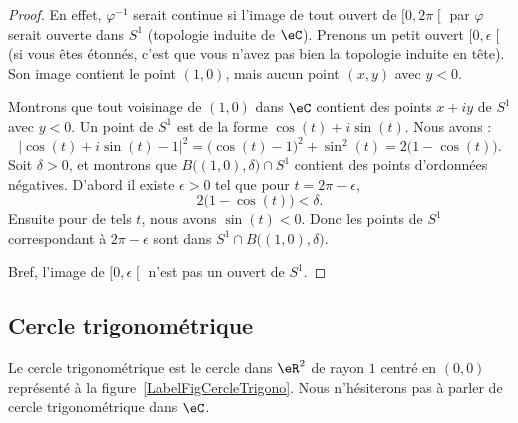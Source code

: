 \begin{proof}
	En effet, \( \varphi^{-1}\) serait continue si l'image de tout ouvert de \( \mathopen[ 0 , 2\pi \mathclose[\) par \( \varphi\) serait ouverte dans \( S^1\) (topologie induite de \( \eC\)). Prenons un petit ouvert \( \mathopen[ 0 , \epsilon \mathclose[\) (si vous êtes étonnés, c'est que vous n'avez pas bien la topologie induite en tête). Son image contient le point \( (1,0)\), mais aucun point \( (x,y)\) avec \( y<0\).

	Montrons que tout voisinage de \( (1,0)\) dans \( \eC\) contient des points \( x+iy\) de \( S^1\) avec \( y<0\). Un point de \( S^1\) est de la forme \( \cos(t)+i\sin(t)\). Nous avons :
	\begin{equation}
		| \cos(t)+i\sin(t)-1 |^2=\big( \cos(t)-1 \big)^2+\sin^2(t)=2\big( 1-\cos(t) \big).
	\end{equation}
	Soit \( \delta>0\), et montrons que \( B\big( (1,0),\delta \big)\cap S^1\) contient des points d'ordonnées négatives. D'abord il existe \( \epsilon>0\) tel que pour \( t=2\pi-\epsilon\),
	\begin{equation}
		2\big( 1-\cos(t) \big)<\delta.
	\end{equation}
	Ensuite pour de tels \( t\), nous avons \( \sin(t)<0\). Donc les points de \( S^1\) correspondant à \( 2\pi-\epsilon\) sont dans \( S^1\cap B\big( (1,0),\delta \big)\).

	Bref, l'image de \( \mathopen[ 0 , \epsilon \mathclose[\) n'est pas un ouvert de \( S^1\).
\end{proof}

\subsection{Cercle trigonométrique}

\newcommand{\CaptionFigCercleTrigono}{Le cercle trigonométrique.}


\begin{definition}
	Le cercle trigonométrique est le cercle dans \( \eR^2\) de rayon $1$ centré en \( (0,0)\) représenté à la figure~\ref{LabelFigCercleTrigono}. Nous n'hésiterons pas à parler de cercle trigonométrique dans \( \eC\).
\end{definition}

